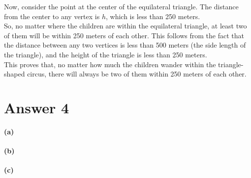 \documentclass[12pt]{article}
\begin{document}
    Now, consider the point at the center of the equilateral triangle. The distance from the center to any vertex is \( h \), which is less than 250 meters.\\

    So, no matter where the children are within the equilateral triangle, at least two of them will be within 250 meters of each other. This follows from the fact that the distance between any two vertices is less than 500 meters (the side length of the triangle), and the height of the triangle is less than 250 meters.\\

    This proves that, no matter how much the children wander within the triangle-shaped circus, there will always be two of them within 250 meters of each other.\\

\section*{Answer 4}
\paragraph{(a)}



\paragraph{(b)}


\paragraph{(c)}
\end{document}

